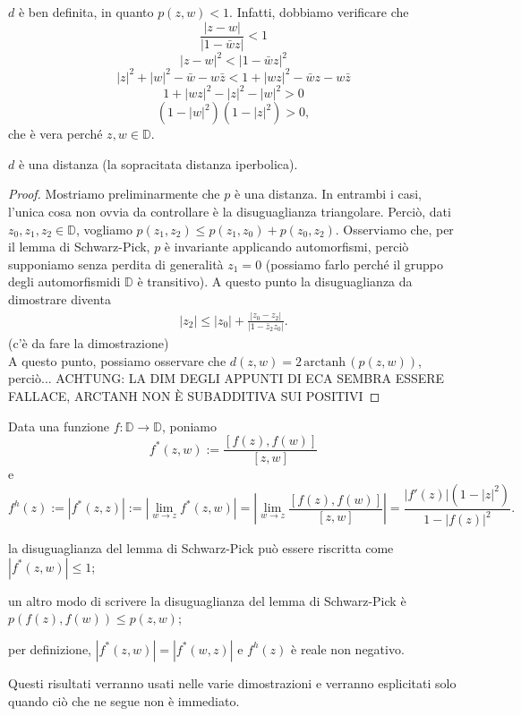 $d$ è ben definita, in quanto $p(z,w)<1$. Infatti, dobbiamo verificare che
  $$\frac{|z-w|}{|1-\bar{w}z|} < 1$$
  $$|z-w|^2 < |1-\bar{w}z|^2$$
  $$|z|^2+|w|^2-\bar{w}-w\bar{z} < 1+|wz|^2-\bar{w}z-w\bar{z}$$
  $$1+|wz|^2-|z|^2-|w|^2 > 0$$
  $$(1-|w|^2)(1-|z|^2) > 0,$$
che è vera perché $z, w \in \mathbb{D}$.

\begin{prop}
  $d$ è una distanza (la sopracitata distanza iperbolica).
\end{prop}

\begin{proof}
  Mostriamo preliminarmente che $p$ è una distanza. In entrambi i casi, l'unica cosa non ovvia da controllare è la disuguaglianza triangolare. Perciò, dati $z_0, z_1, z_2 \in \mathbb{D}$, vogliamo $p(z_1,z_2) \le p(z_1,z_0)+p(z_0,z_2)$. Osserviamo che, per il lemma di Schwarz-Pick, $p$ è invariante applicando automorfismi, perciò supponiamo senza perdita di generalità $z_1=0$ (possiamo farlo perché il gruppo degli automorfismidi $\mathbb{D}$ è transitivo). A questo punto la disuguaglianza da dimostrare diventa
  \begin{align*}
    |z_2| \le |z_0|+\frac{|z_0-z_2|}{|1-\bar{z}_2z_0|}.
  \end{align*}
  (c'è da fare la dimostrazione) \\
  A questo punto, possiamo osservare che $d(z,w) =2\,\text{arctanh}\,(p(z,w))$, perciò... ACHTUNG: LA DIM DEGLI APPUNTI DI ECA SEMBRA ESSERE FALLACE, ARCTANH NON È SUBADDITIVA SUI POSITIVI
\end{proof}

\begin{defn}
  Data una funzione $f: \mathbb{D} \longrightarrow \mathbb{D}$, poniamo
  $$f^*(z,w):=\frac{[f(z),f(w)]}{[z,w]}$$
  e
  $$f^h(z):=|f^*(z,z)|:=\left|\lim_{w \longrightarrow z} f^*(z,w)\right|=\left|\lim_{w \longrightarrow z} \frac{[f(z),f(w)]}{[z,w]}\right|=\frac{|f'(z)|(1-|z|^2)}{1-|f(z)|^2}.$$
\end{defn}

\begin{oss}
  \begin{nlist}
    \item la disuguaglianza del lemma di Schwarz-Pick può essere riscritta come $|f^*(z,w)| \le 1$;
    \item  un altro modo di scrivere la disuguaglianza del lemma di Schwarz-Pick è $p(f(z),f(w)) \le p(z,w)$;
    \item per definizione, $|f^*(z,w)|=|f^*(w,z)|$ e $f^h(z)$ è reale non negativo.
  \end{nlist}
  Questi risultati verranno usati nelle varie dimostrazioni e verranno esplicitati solo quando ciò che ne segue non è immediato.
\end{oss}
